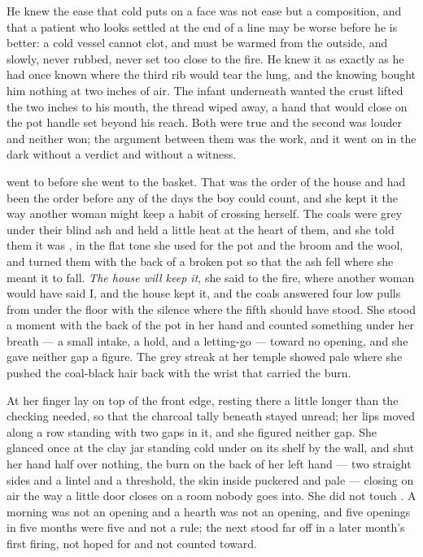 He knew the ease that cold puts on a face was not ease but a composition, and that a patient who looks settled at the end of a line may be worse before he is better: a cold vessel cannot clot, and must be warmed from the outside, and slowly, never rubbed, never set too close to the fire. He knew it as exactly as he had once known where the third rib would tear the lung, and the knowing bought him nothing at two inches of air. The infant underneath wanted the crust lifted the two inches to his mouth, the thread wiped away, a hand that would close on the pot handle set beyond his reach. Both were true and the second was louder and neither won; the argument between them was the work, and it went on in the dark without a verdict and without a witness.

\scenebreak

 went to  before she went to the basket. That was the order of the house and had been the order before any of the days the boy could count, and she kept it the way another woman might keep a habit of crossing herself. The coals were grey under their blind ash and held a little heat at the heart of them, and she told them it was , in the flat tone she used for the pot and the broom and the wool, and turned them with the back of a broken pot so that the ash fell where she meant it to fall. \emph{The house will keep it}, she said to the fire, where another woman would have said I, and the house kept it, and the coals answered four low pulls from under the floor with the silence where the fifth should have stood. She stood a moment with the back of the pot in her hand and counted something under her breath --- a small intake, a hold, and a letting-go --- toward no opening, and she gave neither gap a figure. The grey streak at her temple showed pale where she pushed the coal-black hair back with the wrist that carried the burn.

At  her finger lay on top of the front edge, resting there a little longer than the checking needed, so that the charcoal tally beneath stayed unread; her lips moved along a row standing with two gaps in it, and she figured neither gap. She glanced once at the clay jar standing cold under  on its shelf by the wall, and shut her hand half over nothing, the burn on the back of her left hand --- two straight sides and a lintel and a threshold, the skin inside puckered and pale --- closing on air the way a little door closes on a room nobody goes into. She did not touch . A morning was not an opening and a hearth was not an opening, and five openings in five months were five and not a rule; the next stood far off in a later month's first firing, not hoped for and not counted toward.

